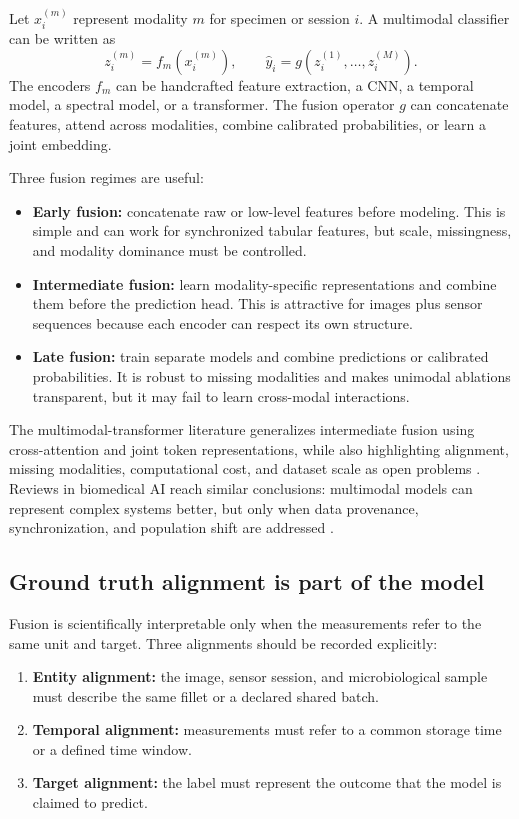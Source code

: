 \documentclass[11pt]{article}
\begin{document}
Let $x_i^{(m)}$ represent modality $m$ for specimen or session $i$. A multimodal classifier can be written as
\begin{equation}
  z_i^{(m)} = f_m\left(x_i^{(m)}\right), \qquad \hat{y}_i = g\left(z_i^{(1)},\ldots,z_i^{(M)}\right).
\end{equation}
The encoders $f_m$ can be handcrafted feature extraction, a CNN, a temporal model, a spectral model, or a transformer. The fusion operator $g$ can concatenate features, attend across modalities, combine calibrated probabilities, or learn a joint embedding.

Three fusion regimes are useful:
\begin{itemize}[leftmargin=*,itemsep=2pt]
  \item \textbf{Early fusion:} concatenate raw or low-level features before modeling. This is simple and can work for synchronized tabular features, but scale, missingness, and modality dominance must be controlled.
  \item \textbf{Intermediate fusion:} learn modality-specific representations and combine them before the prediction head. This is attractive for images plus sensor sequences because each encoder can respect its own structure.
  \item \textbf{Late fusion:} train separate models and combine predictions or calibrated probabilities. It is robust to missing modalities and makes unimodal ablations transparent, but it may fail to learn cross-modal interactions.
\end{itemize}

The multimodal-transformer literature generalizes intermediate fusion using cross-attention and joint token representations, while also highlighting alignment, missing modalities, computational cost, and dataset scale as open problems \citep{Xu2023multimodal}. Reviews in biomedical AI reach similar conclusions: multimodal models can represent complex systems better, but only when data provenance, synchronization, and population shift are addressed \citep{Acosta2022multimodal,Kline2022multimodal}.

\subsection{Ground truth alignment is part of the model}

Fusion is scientifically interpretable only when the measurements refer to the same unit and target. Three alignments should be recorded explicitly:
\begin{enumerate}[leftmargin=*,itemsep=2pt]
  \item \textbf{Entity alignment:} the image, sensor session, and microbiological sample must describe the same fillet or a declared shared batch.
  \item \textbf{Temporal alignment:} measurements must refer to a common storage time or a defined time window.
  \item \textbf{Target alignment:} the label must represent the outcome that the model is claimed to predict.
\end{enumerate}
\end{document}

